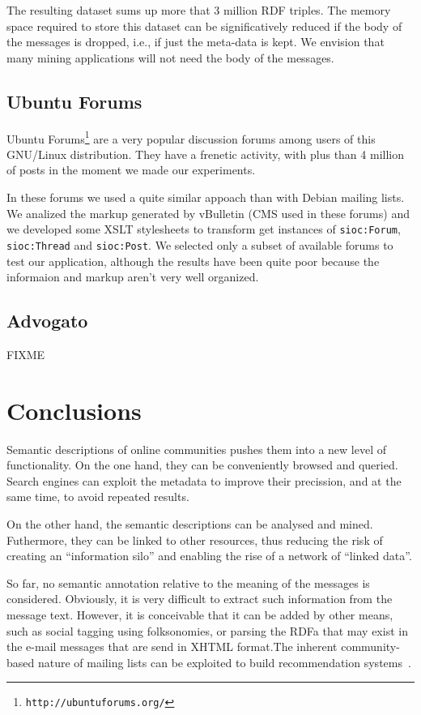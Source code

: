 \documentclass{../templates/www2008-submission}
\begin{document}
The resulting dataset sums up more that 3 million RDF triples. The
memory space required to store this dataset can be significatively
reduced if the body of the messages is dropped, i.e., if just the meta-data
is kept. We envision that many mining applications will not need the
body of the messages.

\subsection{Ubuntu Forums}

Ubuntu Forums\footnote{\texttt{http://ubuntuforums.org/}} are a very popular 
discussion forums among users of this GNU/Linux distribution. They have a 
frenetic activity, with plus than 4 million of posts in the moment we made
our experiments.

In these forums we used a quite similar appoach than with Debian mailing
lists. We analized the markup generated by vBulletin (CMS used in these forums)
and we developed some XSLT stylesheets to transform get instances of
\texttt{sioc:Forum}, \texttt{sioc:Thread} and \texttt{sioc:Post}. We 
selected only a subset of available forums to test our application,
although the results have been quite poor because the informaion and 
markup aren't very well organized.

\subsection{Advogato}

FIXME


\section{\label{sec:conclusions}Conclusions}

Semantic descriptions of online communities pushes them
into a new level of functionality. On the one hand, they can be
conveniently browsed and queried. Search engines can exploit the
metadata to improve their precission, and at the same time, to
avoid repeated results.

On the other hand, the semantic descriptions can be
analysed and mined. Futhermore, they can be linked to other resources,
thus reducing the risk of creating an ``information silo'' and
enabling the rise of a network of ``linked data''.

So far, no semantic annotation relative to the meaning of
the messages is considered. Obviously, it is very difficult
to extract such information from the message text.
However, it is conceivable that it can be added by other 
means, such as social tagging using folksonomies, or parsing the 
RDFa that may exist in the e-mail messages that are send in XHTML 
format.The inherent community-based nature of mailing lists can
be exploited to build recommendation systems~\cite{Celma2006}.
\end{document}
